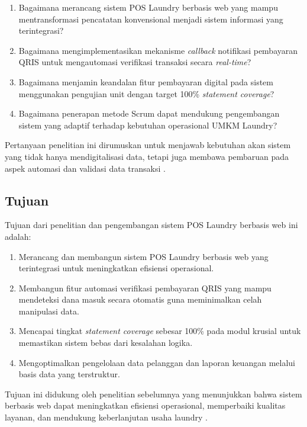 \begin{enumerate}
    \item Bagaimana merancang sistem POS Laundry berbasis web yang mampu mentransformasi pencatatan konvensional menjadi sistem informasi yang terintegrasi?
    \item Bagaimana mengimplementasikan mekanisme \textit{callback} notifikasi pembayaran QRIS untuk mengautomasi verifikasi transaksi secara \textit{real-time}?
    \item Bagaimana menjamin keandalan fitur pembayaran digital pada sistem menggunakan pengujian unit dengan target 100\% \textit{statement coverage}?
    \item Bagaimana penerapan metode Scrum dapat mendukung pengembangan sistem yang adaptif terhadap kebutuhan operasional UMKM Laundry?
\end{enumerate}

\noindent
Pertanyaan penelitian ini dirumuskan untuk menjawab kebutuhan akan sistem yang tidak hanya mendigitalisasi data, tetapi juga membawa pembaruan pada aspek automasi dan validasi data transaksi \cite{Achyani2024,Mutia2025}.

\subsection{Tujuan}
\noindent
Tujuan dari penelitian dan pengembangan sistem POS Laundry berbasis web ini adalah:

\begin{enumerate}
    \item Merancang dan membangun sistem POS Laundry berbasis web yang terintegrasi untuk meningkatkan efisiensi operasional.
    \item Membangun fitur automasi verifikasi pembayaran QRIS yang mampu mendeteksi dana masuk secara otomatis guna meminimalkan celah manipulasi data.
    \item Mencapai tingkat \textit{statement coverage} sebesar 100\% pada modul krusial untuk memastikan sistem bebas dari kesalahan logika.
    \item Mengoptimalkan pengelolaan data pelanggan dan laporan keuangan melalui basis data yang terstruktur.
\end{enumerate}

\noindent
Tujuan ini didukung oleh penelitian sebelumnya yang menunjukkan bahwa sistem berbasis web dapat meningkatkan efisiensi operasional, memperbaiki kualitas layanan, dan mendukung keberlanjutan usaha laundry \cite{Achyani2024,Kalo2023,SigitSugiharto2023,Maulana2025}.

